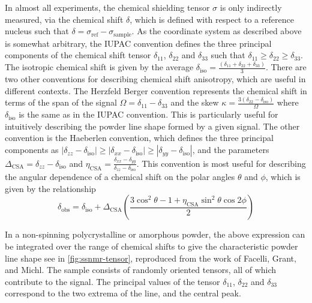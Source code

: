 \begin{refsection}
In almost all experiments, the chemical shielding tensor $ \sigma $ is only indirectly measured, via the chemical shift $ \delta $, which is defined with respect to a reference nucleus such that $ \delta = \sigma_{\textrm{ref}} - \sigma_{\textrm{sample}} $.
As the coordinate system as described above is somewhat arbitrary, the IUPAC convention defines the three principal components of the chemical shift tensor $ \delta_{11} $, $ \delta_{22} $ and $ \delta_{33} $ such that $ \delta_{11} \geq \delta_{22} \geq \delta_{33} $.
The isotropic chemical shift is given by the average $ \delta_{\textrm{iso}} = \frac{(\delta_{11} + \delta_{22} + \delta_{33})}{3} $.
There are two other conventions for describing chemical shift anisotropy, which are useful in different contexts.
The Herzfeld Berger convention represents the chemical shift in terms of the span of the signal $ \Omega = \delta_{11} - \delta_{33} $ and the skew $ \kappa = \frac{3(\delta_{22} - \delta_{\textrm{iso}})}{\Omega} $ where $ \delta_{\textrm{iso}} $ is the same as in the IUPAC convention.
This is particularly useful for intuitively describing the powder line shape formed by a given signal.
The other convention is the Haeberlen convention, which defines the three principal components as $ |\delta_{zz} - \delta_{\textrm{iso}}| \geq |\delta_{xx} - \delta_{\textrm{iso}}| \geq |\delta_{yy} - \delta_{\textrm{iso}}| $, and the parameters $ \Delta_{\textrm{CSA}} = \delta_{zz} -\delta_{\textrm{iso}} $ and $ \eta_{\textrm{CSA}} = \frac{\delta_{xx} - \delta_{yy}}{\delta_{zz} -\delta_{\textrm{iso}}} $.
This convention is most useful for describing the angular dependence of a chemical shift on the polar angles $ \theta $ and $ \phi $, which is given by the relationship\autocite{Haeberlen1976}
\begin{equation}
  \delta_{\textrm{obs}} = \delta_{\textrm{iso}} + \Delta_{\textrm{CSA}} \left(\frac{3 \cos^2 \theta - 1 + \eta_{\textrm{CSA}} \sin^2 \theta \cos 2 \phi}{2} \right)
  \label{eqn:orientation-csa}
\end{equation}

In a non-spinning polycrystalline or amorphous powder, the above expression can be integrated over the range of chemical shifts to give the characteristic powder line shape see in \cref{fig:ssnmr-tensor}, reproduced from the work of Facelli, Grant, and Michl.\autocite{Facelli1987Carbon-13Determination}
The sample consists of randomly oriented tensors, all of which contribute to the signal.
The principal values of the tensor $ \delta_{11} $, $ \delta_{22} $ and $ \delta_{33} $ correspond to the two extrema of the line, and the central peak.


\end{refsection}
